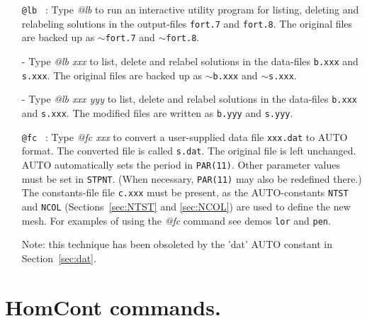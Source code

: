 \documentclass[12pt]{report}
\begin{document}
\begin{itemize}
\item[\tt @lb]~:
  Type {\it @lb} to run an interactive utility program
  for listing, deleting and relabeling solutions 
  in the output-files {\tt fort.7} and {\tt fort.8}.
  The original files are backed up as
{\tt $\sim$fort.7} and {\tt $\sim$fort.8}. 
  \item[-]
  Type {\it @lb xxx} to list, delete and relabel solutions
  in the data-files {\tt b.xxx} and {\tt s.xxx}.
  The original files are backed up as {\tt $\sim$b.xxx} and {\tt $\sim$s.xxx}. 
\item[-]
  Type {\it @lb xxx yyy} to list, delete and relabel solutions
  in the data-files {\tt b.xxx} and {\tt s.xxx}.
  The modified files are written as {\tt b.yyy} and {\tt s.yyy}. 

\item[\tt @fc]~:
  Type {\it @fc xxx} to convert a user-supplied data file {\tt xxx.dat}
  to {\cal AUTO} format. The converted file is called {\tt s.dat}.
  The original file is left unchanged.
  {\cal AUTO} automatically sets the period in {\tt PAR(11)}.
  Other parameter values must be set in {\tt STPNT}. (When necessary,
  {\tt PAR(11)} may also be redefined there.) 
  The constants-file file {\tt c.xxx} must be present, as the 
  {\cal AUTO}-constants {\tt NTST} and {\tt NCOL} 
  (Sections~\ref{sec:NTST} and \ref{sec:NCOL}) are used to define the new mesh.
  For examples of using the {\it @fc} command see demos {\tt lor} and {\tt pen}.
  
  Note: this technique has been obsoleted by the 'dat' AUTO constant
  in Section~\ref{sec:dat}.

\end{itemize}

\section{ HomCont commands.} 
\end{document}
